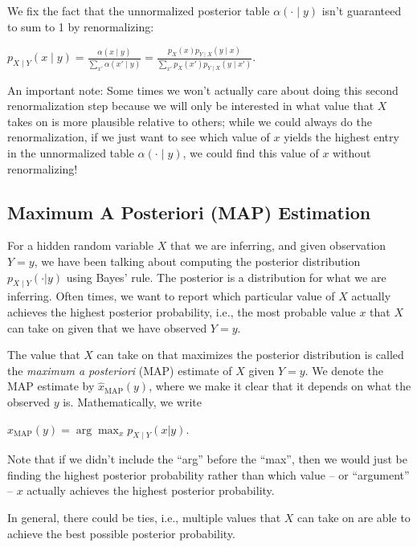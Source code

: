 \documentclass[6008notes.tex]{subfiles}
\begin{document}
We fix the fact that the unnormalized posterior table $\alpha (\cdot \mid y)$ isn't guaranteed to sum to 1 by renormalizing:

{\centering$p_{X\mid Y}(x\mid y)=\frac{\alpha (x\mid y)}{\sum _{ x'}\alpha ( x'\mid y)}=\frac{p_{X}(x)p_{Y\mid X}(y\mid x)}{\sum _{ x'}p_{X}( x')p_{Y\mid X}(y\mid x')}.$ \par}
 
An important note: Some times we won't actually care about doing this second renormalization step because we will only be interested in what value that $X$ takes on is more plausible relative to others; while we could always do the renormalization, if we just want to see which value of $x$ yields the highest entry in the unnormalized table $\alpha (\cdot \mid y)$, we could find this value of $x$ without renormalizing!

\subsection{Maximum A Posteriori (MAP) Estimation}

For a hidden random variable $X$ that we are inferring, and given observation $Y=y$, we have been talking about computing the posterior distribution $p_{X \mid Y}(\cdot | y)$ using Bayes' rule. The posterior is a distribution for what we are inferring. Often times, we want to report which particular value of $X$ actually achieves the highest posterior probability, i.e., the most probable value $x$ that $X$ can take on given that we have observed $Y=y$.

The value that $X$ can take on that maximizes the posterior distribution is called the \textit{maximum a posteriori} (MAP) estimate of $X$ given $Y=y$. We denote the MAP estimate by $\widehat{x}_{\text {MAP}}(y)$, where we make it clear that it depends on what the observed $y$ is. Mathematically, we write

{\centering$\widehat{x}_{\text {MAP}}(y) = \arg \max _ x p_{X \mid Y}(x | y).$ \par}
 
Note that if we didn't include the ``arg'' before the ``max'', then we would just be finding the highest posterior probability rather than which value -- or ``argument'' -- $x$ actually achieves the highest posterior probability.

In general, there could be ties, i.e., multiple values that $X$ can take on are able to achieve the best possible posterior probability.
\end{document}
